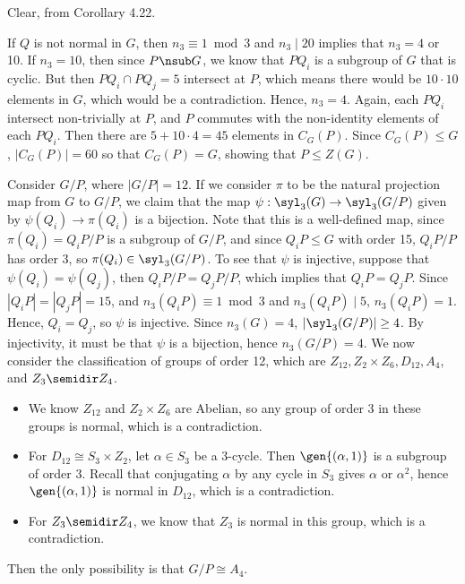 \begin{solenum}[spsol]
    \item Clear, from Corollary 4.22.
    \item If $Q$ is not normal in $G$, then $n_3 \equiv 1 \bmod 3$ and $n_3 \mid 20$ implies that $n_3 = 4$ or 10.
	If $n_3 = 10$, then since $P \nsub G$, we know that $PQ_i$ is a subgroup of $G$ that is cyclic.
	But then $PQ_i \cap PQ_j = 5$ intersect at $P$, which means there would be $10 \cdot 10$ elements in $G$, which would be a contradiction.
	Hence, $n_3 = 4$.
	Again, each $PQ_i$ intersect non-trivially at $P$, and $P$ commutes with the non-identity elements of each $PQ_i$.
	Then there are $5 + 10 \cdot 4 = 45$ elements in $C_G(P)$.
	Since $C_G(P) \leq G$, $|C_G(P)| = 60$ so that $C_G(P) = G$, showing that $P \leq Z(G)$.
    
    Consider $G/P$, where $|G/P| = 12$.
	If we consider $\pi$ to be the natural projection map from $G$ to $G/P$, we claim that the map $\psi : \syl_3(G) \to \syl_3(G/P)$ given by $\psi(Q_i) \to \pi(Q_i)$ is a bijection.
	Note that this is a well-defined map, since $\pi(Q_i) = Q_iP/P$ is a subgroup of $G/P$, and since $Q_iP \leq G$ with order 15, $Q_iP/P$ has order 3, so $\pi(Q_i) \in \syl_3(G/P)$.
	To see that $\psi$ is injective, suppose that $\psi(Q_i) = \psi(Q_j)$, then $Q_iP/P = Q_jP/P$, which implies that $Q_iP = Q_jP$.
	Since $|Q_iP| = |Q_jP| = 15$, and $n_3(Q_iP) \equiv 1 \bmod 3$ and $n_3(Q_iP) \mid 5$, $n_3(Q_iP) = 1$.
	Hence, $Q_i = Q_j$, so $\psi$ is injective.
	Since $n_3(G) = 4$, $|\syl_3(G/P)| \geq 4$.
	By injectivity, it must be that $\psi$ is a bijection, hence $n_3(G/P) = 4$.
	We now consider the classification of groups of order 12, which are $Z_{12}, Z_2 \times Z_6, D_{12}, A_4$, and $Z_3 \semidir Z_4$.
    \begin{itemize}
        \item We know $Z_{12}$ and $Z_2 \times Z_6$ are Abelian, so any group of order 3 in these groups is normal, which is a contradiction.
        \item For $D_{12} \cong S_3 \times Z_2$, let $\alpha \in S_3$ be a 3-cycle.
	Then $\gen{(\alpha, 1)}$ is a subgroup of order 3.
	Recall that conjugating $\alpha$ by any cycle in $S_3$ gives $\alpha$ or $\alpha^2$, hence $\gen{(\alpha, 1)}$ is normal in $D_{12}$, which is a contradiction.
        \item For $Z_3 \semidir Z_4$, we know that $Z_3$ is normal in this group, which is a contradiction.
    \end{itemize}
    Then the only possibility is that $G/P \cong A_4$.


\end{solenum}
